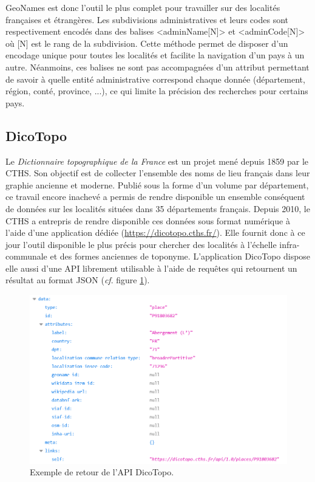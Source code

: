 \documentclass[a4paper,12pt,twoside]{book}
\begin{document}
	
	GeoNames est donc l'outil le plus complet pour travailler sur des localités françaises et étrangères. Les subdivisions administratives et leurs codes sont respectivement encodés dans des balises <adminName[N]> et <adminCode[N]> où [N] est le rang de la subdivision. Cette méthode permet de disposer d'un encodage unique pour toutes les localités et facilite la navigation d'un pays à un autre. Néanmoins, ces balises ne sont pas accompagnées d'un attribut permettant de savoir à quelle entité administrative correspond chaque donnée (département, région, conté, province, ...), ce qui limite la précision des recherches pour certains pays.
	
	\subsection{DicoTopo}
	
	Le \textit{Dictionnaire topographique de la France} est un projet mené depuis 1859 par le CTHS. Son objectif est de collecter l'ensemble des noms de lieu français dans leur graphie ancienne et moderne. Publié sous la forme d'un volume par département, ce travail encore inachevé a permis de rendre disponible un ensemble conséquent de données sur les localités situées dans 35 départements français. Depuis 2010, le CTHS a entrepris de rendre disponible ces données sous format numérique à l'aide d'une application dédiée (\url{https://dicotopo.cths.fr/}). Elle fournit donc à ce jour l'outil disponible le plus précis pour chercher des localités à l'échelle infra-communale et des formes anciennes de toponyme. L'application DicoTopo dispose elle aussi d'une API librement utilisable à l'aide de requêtes qui retournent un résultat au format JSON (\textit{cf}. figure \ref{API_dicotopo}).
	
	\begin{figure}
		\centering
		\includegraphics[width=\textwidth]{Images/Result_dicotopo.png}
		\caption{Exemple de retour de l'API DicoTopo.}
		\label{API_dicotopo}
	\end{figure}
	
\end{document}
